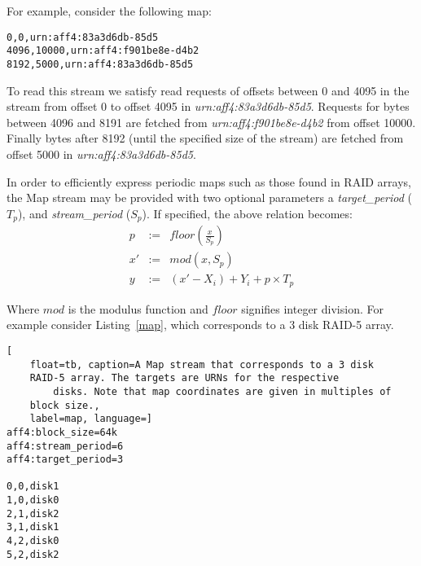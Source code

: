 \documentclass[10pt, conference]{IEEEtran}
\begin{document}
For example, consider the following map:
\begin{lstlisting}
0,0,urn:aff4:83a3d6db-85d5
4096,10000,urn:aff4:f901be8e-d4b2
8192,5000,urn:aff4:83a3d6db-85d5
\end{lstlisting}

To read this stream we satisfy read requests of offsets between 0 and
4095 in the stream from offset 0 to offset 4095 in
\emph{urn:aff4:83a3d6db-85d5}. Requests for bytes between 4096 and 8191 are
fetched from \emph{urn:aff4:f901be8e-d4b2} from offset 10000. Finally
bytes after 8192 (until the specified size of the stream) are fetched
from offset 5000 in \emph{urn:aff4:83a3d6db-85d5}.

In order to efficiently express periodic maps such as those found in
RAID arrays, the Map stream may be provided with two optional
parameters a {\em target\_period} ($T_p$), and {\em stream\_period}
($S_p$). If specified, the above relation becomes:
\begin{eqnarray*}
p &:=& floor\left (\frac{x}{S_p} \right) \\
x' &:=& mod(x ,S_p)  \\   \label{eq:no1}
y &:=& (x'-X_i) + Y_i + p \times T_p
\end{eqnarray*}

Where $mod$ is the modulus function and $floor$ signifies integer
division. For example consider Listing~\ref{map}, which corresponds to a 3
disk RAID-5 array.

\begin{lstlisting}[
	float=tb, caption=A Map stream that corresponds to a 3 disk
	RAID-5 array. The targets are URNs for the respective
        disks. Note that map coordinates are given in multiples of 
	block size.,
	label=map, language=]
aff4:block_size=64k 
aff4:stream_period=6 
aff4:target_period=3

0,0,disk1
1,0,disk0
2,1,disk2
3,1,disk1
4,2,disk0
5,2,disk2
\end{lstlisting}


\end{document}

